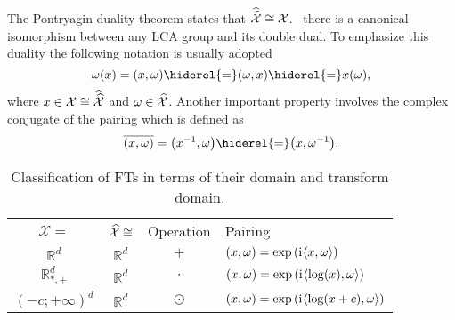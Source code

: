 \paragraph{}
The Pontryagin duality theorem states that $\widehat{\widehat{\mathcal{X}}}\cong \mathcal{X}$. \Ie~there is a canonical isomorphism between any \acs{LCA} group and its double dual. To emphasize this duality the following notation is usually adopted
\begin{dmath}
\omega(x)=\pairing{x,\omega}\hiderel{=}\pairing{\omega,x}\hiderel{=}x(\omega),
\end{dmath}
where $x\in\mathcal{X}\cong\widehat{\widehat{\mathcal{X}}}$ and $\omega\in\widehat{\mathcal{X}}$. Another important property involves the complex conjugate of the pairing which is defined as
\begin{dmath}
\conj{\pairing{x,\omega}} = \pairing*{\inv{x},\omega}\hiderel{=}\pairing*{x,\inv{\omega}}.
\end{dmath}
\begin{table}[!ht]\label{table:pairings}
\caption{Classification of \acl{FT}s in terms of their domain and transform domain.}
\label{tab:dual_and_pairing}
\centering
\begin{tabularx}{\textwidth}{cccX}
\toprule
\multicolumn{1}{c}{$\mathcal{X}=$} & \multicolumn{1}{c}{$\widehat{\mathcal{X}}\cong$} & \multicolumn{1}{c}{Operation} & \multicolumn{1}{l}{Pairing} \\
\cmidrule{1-4}
$\mathbb{R}^d$ & $\mathbb{R}^d$ & $+$ & $(x,\omega) = \exp\left({\mathrm{i}\mkern1mu} \langle x, \omega\rangle\right)$ \\
$\mathbb{R}^d_{*,+}$ & $\mathbb{R}^d$ & $\cdot$ & $(x,\omega) =\exp\left( {\mathrm{i}\mkern1mu} \langle\log(x), \omega\rangle \right)$ \\
$(-c;+\infty)^d$ & $\mathbb{R}^d$ & $\odot$ & $(x,\omega) =\exp\left( {\mathrm{i}\mkern1mu} \langle\log(x+c), \omega\rangle \right)$ \\
\bottomrule
\end{tabularx}
\end{table}
